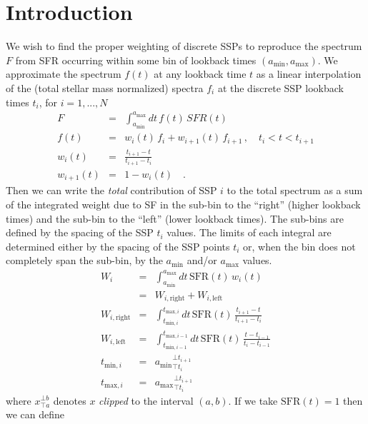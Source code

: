 \documentclass[12pt, letterpaper, preprint]{aastex}
\newcommand{\tmin}[1][]{t_{\mathrm{min} #1}}
\newcommand{\tmax}[1][]{t_{\mathrm{max} #1}}
\newcommand{\amin}{a_{\mathrm{min}}}
\newcommand{\amax} {a_{\mathrm{max}}}
\newcommand{\tintegral}{\int_{\tmin[,i]}^{\tmax[,i]} dt}
\newcommand{\clip}[3][]{{#1}_{\top {#2}}^{\bot {#3}}}
\begin{document}
\author{B. Johnson}


\section{Introduction}
We wish to find the proper weighting of discrete SSPs to reproduce the spectrum $F$ from SFR occurring within some bin of  lookback times $(\amin, \amax)$.
We approximate the spectrum $f(t)$ at any lookback time $t$ as a linear interpolation of the (total stellar mass normalized) spectra $f_i$ at the discrete SSP lookback times $t_i$, for $i=1,...,N$ 
\begin{eqnarray}
F & = & \int_{\amin}^{\amax} dt \, f(t) \, SFR(t) \nonumber \\
f(t) & = & w_{i}(t) \, f_i + w_{i+1}(t) \, f_{i+1} \, , \quad t_i < t < t_{i+1}  \nonumber \\
w_{i}(t) & = & \frac{t_{i+1} - t}{t_{i+1}  - t_i} \nonumber \\
w_{i+1}(t) & = & 1 - w_i(t) \quad . \nonumber
\end{eqnarray}
Then we can write the \emph{total} contribution of SSP $i$ to the total spectrum as a sum of the integrated weight due to SF in the sub-bin to the ``right'' (higher lookback times) and the  sub-bin to the ``left'' (lower lookback times).
The sub-bins are defined by the spacing of the SSP $t_i$ values. 
The limits of each integral are determined either by the spacing of the SSP points $t_i$ or, when the bin does not completely span the sub-bin, by the $\amin$ and/or $\amax$ values.
\begin{eqnarray}
W_i & = &  \int_{\amin}^{\amax} dt \, \mathrm{SFR}(t) \, w_i(t) \nonumber \\
 & = & W_{i, \mathrm{right}} + W_{i, \mathrm{left}} \nonumber \\
W_{i, \mathrm{right}} & = & \tintegral \, \mathrm{SFR}(t) \, \frac{t_{i+1} - t}{t_{i+1}  - t_i} \nonumber \\
W_{i, \mathrm{left}} & = & \int_{\tmin[,i-1]}^{\tmax[,i-1]} dt \, \mathrm{SFR}(t) \, \frac{t - t_{i-1}}{t_{i}  - t_{i-1}} \nonumber \\
\tmin[,i] & = & \clip[\amin]{t_i}{t_{i+1}} \nonumber \\
\tmax[,i] & = & \clip[\amax]{t_i}{t_{i+1}} \nonumber
\end{eqnarray}
where $\clip[x]{a}{b}$ denotes $x$ \emph{clipped} to the interval $(a,b)$. If we take $\mathrm{SFR}(t) = 1$ then we can define
\end{document}
